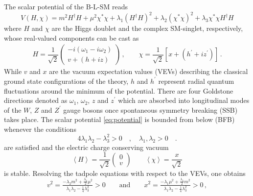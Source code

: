 \documentclass[a4paper,11pt]{article}
\newcommand{\vevs}[0]{VEVs}
\renewcommand{\(}{\left(}
\renewcommand{\)}{\right)}
\renewcommand{\[}{\left[}
\renewcommand{\]}{\right]}
\newcommand{\mean}[1]{\left \langle #1 \right \rangle }
\begin{document}
The scalar potential of the B-L-SM reads
%
\begin{equation}
\label{eq:potential}
V(H,\chi)= m^2 H^\dagger H + \mu^2 \chi^\ast \chi + \lambda_1 (H^\dagger H)^2 + \lambda_2 \(\chi^\ast \chi\)^2 + \lambda_3  \chi^\ast \chi H^\dagger H
\end{equation}
%
where $H$ and $\chi$ are the Higgs doublet and the complex SM-singlet, respectively, whose real-valued components can be cast as 
\begin{equation}
\begin{aligned}
H = \dfrac{1}{\sqrt{2}} 
\begin{pmatrix}
-i \(\omega_1 - i \omega_2 \) \\
v + (h + i z)
\end{pmatrix}\,,	
\qquad
\chi = \dfrac{1}{\sqrt{2}} \[ x + \(h^\prime + i z^\prime\) \]\,.	
\end{aligned}
\end{equation}	
%
While $v$ and $x$ are the vacuum expectation values (\vevs) describing the classical ground state configurations of the theory, $h$ and $h^\prime$ represent radial quantum fluctuations around the minimum of the potential. There are four Goldstone directions denoted as $\omega_1$, $\omega_2$, $z$ and $z^\prime$ which are absorbed into longitudinal modes of the $W$, $Z$ and $Z^\prime$ gauge bosons once spontaneous symmetry breaking (SSB) takes place. The scalar potential \eqref{eq:potential} is bounded from below (BFB) whenever the conditions \cite{Basso:2010jm}
%
\begin{equation}
4 \lambda_1 \lambda_2  -  \lambda_3^2 > 0 \quad , \quad \lambda_1 , \lambda_2>0 \quad . 
\label{eq:BFB}
\end{equation}
%
are satisfied and the electric charge conserving vacuum
\begin{equation}
\mean{H} = \dfrac{1}{\sqrt{2}} 
\begin{pmatrix}
0 \\
v 
\end{pmatrix}	
\qquad
\mean{\chi} = \dfrac{x}{\sqrt{2}}
\label{eq:vacuum}
\end{equation}
is stable. Resolving the tadpole equations with respect to the \vevs, one obtains
\begin{equation}
	v^2 = \tfrac{-\lambda_2 m^2 + \tfrac{\lambda_3}{2}\mu^2}{\lambda_1 \lambda_2 - \tfrac{1}{4}\lambda_3^2} > 0
	\qquad
	\text{and}
	\qquad
	x^2 = \tfrac{-\lambda_1 \mu^2 + \tfrac{\lambda_3}{2}m^2}{\lambda_1 \lambda_2 - \tfrac{1}{4}\lambda_3^2} > 0\,,
	\label{eq:extremum}
\end{equation}
\end{document}
